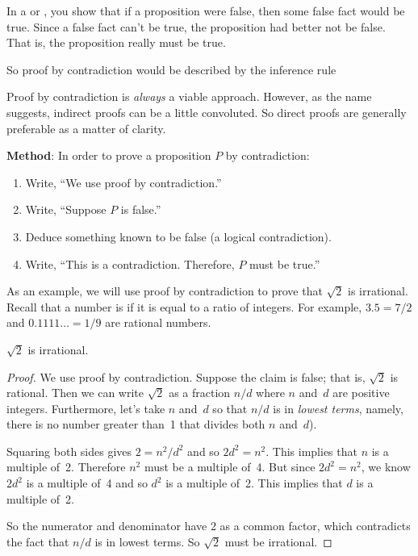 In a  or , you show that
if a proposition were false, then some false fact would be true.  Since a
false fact can't be true, the proposition had better not be false.  That
is, the proposition really must be true. 

\begin{editingnotes}

So proof by
contradiction would be described by the inference rule
\begin{rul*}
\end{rul*}

\end{editingnotes}

Proof by contradiction is \emph{always} a viable approach.  However, as
the name suggests, indirect proofs can be a little convoluted.  So direct
proofs are generally preferable as a matter of clarity.

\textbf{Method}: In order to prove a proposition $P$ by contradiction:

\begin{enumerate}

\item Write, ``We use proof by contradiction.''

\item Write, ``Suppose $P$ is false.''

\item Deduce something known to be false (a logical contradiction).

\item Write, ``This is a contradiction.  Therefore, $P$ must be
true.''

\end{enumerate}


As an example, we will use proof by contradiction to prove that
$\sqrt{2}$ is irrational.  Recall that a number is  if
it is equal to a ratio 
of integers.  For example, $3.5 = 7/2$ and $0.1111\dots = 1/9$ are
rational numbers.

\begin{theorem}\label{thm:sqrt2irr_by_contra}
$\sqrt{2}$ is irrational.
\end{theorem}

\begin{proof}

We use proof by contradiction.  Suppose the claim is false; that is,
$\sqrt{2}$ is rational.  Then we can write $\sqrt{2}$ as a fraction
$n/d$ where $n$ and~$d$ are positive integers.  Furthermore, let's
take $n$ and~$d$ so that $n/d$ is in \emph{lowest terms}, namely,
there is no number greater than~1 that divides both $n$ and~$d$).

Squaring both sides gives $2 = n^2/d^2$ and so $2 d^2 = n^2$.  This
implies that $n$ is a multiple of~2.  Therefore $n^2$ must be a
multiple of~4.  But since $2 d^2 = n^2$, we know $2d^2$ is a multiple
of~4 and so $d^2$ is a multiple of~2.  This implies that $d$ is a
multiple of~2.

So the numerator and denominator have 2 as a common factor, which
contradicts the fact that $n/d$ is in lowest terms.  So $\sqrt{2}$
must be irrational.
\end{proof}

